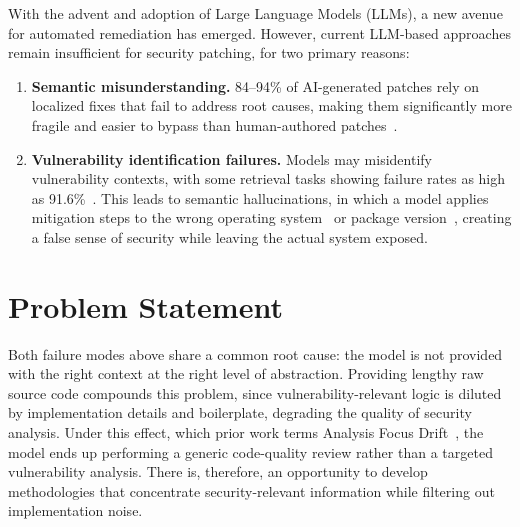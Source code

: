 With the advent and adoption of Large Language Models (LLMs), a new avenue for automated remediation has emerged.
However, current LLM-based approaches remain insufficient for security patching, for two primary reasons:

\begin{enumerate}
    \item \textbf{Semantic misunderstanding.} 84--94\% of AI-generated patches rely on localized fixes that fail to address root causes, making them significantly more fragile and easier to bypass than human-authored patches~\cite{mahmud2025systematic}.
    \item \textbf{Vulnerability identification failures.} Models may misidentify vulnerability contexts, with some retrieval tasks showing failure rates as high as 91.6\%~\cite{McClanahan2024Meets}.
    This leads to semantic hallucinations, in which a model applies mitigation steps to the wrong operating system~\cite{McClanahan2024Meets} or package version~\cite{zemicheal2024llm}, creating a false sense of security while leaving the actual system exposed.
\end{enumerate}

\section{Problem Statement}

Both failure modes above share a common root cause: the model is not provided with the right context at the right level of abstraction.
Providing lengthy raw source code compounds this problem, since vulnerability-relevant logic is diluted by implementation details and boilerplate, degrading the quality of security analysis.
Under this effect, which prior work terms Analysis Focus Drift~\cite{contextenhancedYang}, the model ends up performing a generic code-quality review rather than a targeted vulnerability analysis.
There is, therefore, an opportunity to develop methodologies that concentrate security-relevant information while filtering out implementation noise.

